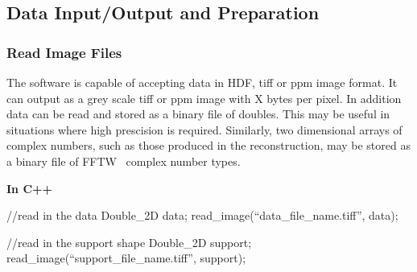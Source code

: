 \documentclass[]{nadia}
\begin{document}
\begin{comment}
                          {\bf In C++} 
                          \begin{myverbatim}[language=C++]
                            //Create a complex 2D field which will
                            //hold the result of the reconstruction.
                            Complex_2D object_estimate(nx,ny);
                            
                            //Create the planar CDI object which will
                            //be used to perform the reconstruction.
                            PlanarCDI planar(object_estimate);
                            
                            //set the support and intensity
                            planar.set_support(support,false);
                            planar.set_intensity(data);
                          \end{myverbatim}
                              {\bf In IDL}
                              \begin{myverbatim}[language=IDL]
                                NADIA_INIT_PLANAR, data, support
                              \end{myverbatim}
                        }
                          
\end{comment}

\subsection{Data Input/Output and Preparation}

\subsubsection{Read Image Files}

\label{subsec:read_images}

The software is capable of accepting data in HDF, tiff or ppm image
format. It can output as a grey scale tiff or ppm image with X bytes
per pixel. In addition data can be read and stored as a binary file of
doubles. This may be useful in situations where high prescision is
required. Similarly, two dimensional arrays of complex numbers, such
as those produced in the reconstruction, may be stored as a binary
file of FFTW~\cite{fftw} complex number types.

{\bf In C++} 
\begin{myverbatim}[language=C++]
  //read in the data
  Double_2D data;
  read_image(``data_file_name.tiff'', data);
  
  //read in the support shape
  Double_2D support;
  read_image(``support_file_name.tiff'', support);
  \end{myverbatim}
\end{document}
